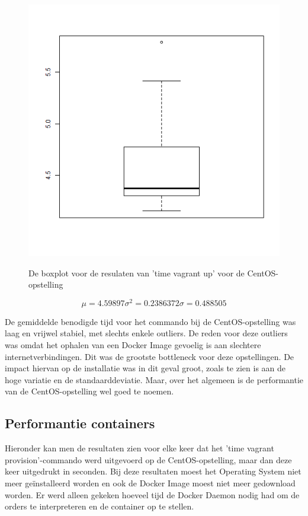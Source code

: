 \begin{figure}
	\centering
	\caption{De boxplot voor de resulaten van 'time vagrant up' voor de CentOS-opstelling}
	\includegraphics[scale=0.5]{img/centosfullboxplot.png}
	\label{fig:centosupboxplot}
\end{figure}

\[\mu = 4.59897 \sigma^2 = 0.2386372 \sigma = 0.488505\]

De gemiddelde benodigde tijd voor het commando bij de CentOS-opstelling was laag en vrijwel stabiel, met slechts enkele outliers. De reden voor deze outliers was omdat het ophalen van een Docker Image gevoelig is aan slechtere internetverbindingen. Dit was de grootste bottleneck voor deze opstellingen. De impact hiervan op de installatie was in dit geval groot, zoals te zien is aan de hoge variatie en de standaarddeviatie. Maar, over het algemeen is de performantie van de CentOS-opstelling wel goed te noemen.

\subsection{Performantie containers}
Hieronder kan men de resultaten zien voor elke keer dat het 'time vagrant provision'-commando werd uitgevoerd op de CentOS-opstelling, maar dan deze keer uitgedrukt in seconden. Bij deze resultaten moest het Operating System niet meer geïnstalleerd worden en ook de Docker Image moest niet meer gedownload worden. Er werd alleen gekeken hoeveel tijd de Docker Daemon nodig had om de orders te interpreteren en de container op te stellen.

